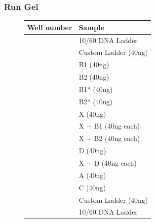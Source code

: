 \documentclass[letterpaper]{article}
\newcounter{magicrownumbers}
\newcommand\rownumber{\stepcounter{magicrownumbers}\arabic{magicrownumbers}}
\begin{document}
\begin{enumerate}
\subsubsection{Run Gel}
\begin{figure}[ht] %
\begin{center} 
\begin{tabular}{|l|l|}
\hline
Well number				& Sample \\ \hline
\rownumber                                 & 10/60 DNA Ladder   \\ \hline
\rownumber				   & Custom Ladder (40ng) \\ \hline
\rownumber                                 & B1 (40ng)\\ \hline
\rownumber                                 & B2 (40ng)\\ \hline
\rownumber                                 & B1* (40ng)\\ \hline
\rownumber                                 & B2* (40ng)\\ \hline
\rownumber                                 & X (40ng) \\ \hline
\rownumber                                 & X + B1  (40ng each)\\ \hline
\rownumber                                 & X + B2  (40ng each)\\ \hline
\rownumber				   & D (40ng)	\\ \hline
\rownumber                                 & X + D (40ng each)	\\ \hline
\rownumber                                 & A (40ng)	\\ \hline
\rownumber                                 & C (40ng)  \\ \hline
\rownumber                                 & Custom Ladder (40ng)     \\ \hline
\rownumber                                 & 10/60 DNA Ladder  \\ \hline


\end{tabular}
\end{center}
\end{figure}
\end{enumerate}
\end{document}
